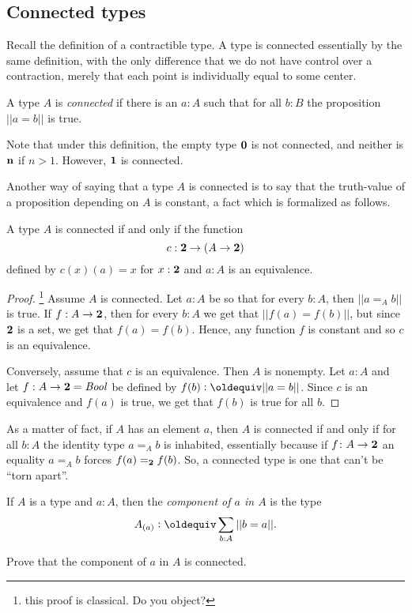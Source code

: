 \begin{definition}
\subsection{Connected types}
\label{sec:connectedtypes}
Recall the definition of a contractible type.  A type is connected essentially by the same definition, with the only difference that we do not have control over a contraction, merely that each point is individually equal to some center.
\begin{definition}\label{def:connected}
A type $A$ is \emph{connected} if there is an $a:A$ such that for all $b:B$ the proposition $||a=b||$ is true.  
\end{definition}
Note that under this definition, the empty type $\mathbf{0} $ is not connected, and neither is $\mathbf{n} $ if $n>1$. However, $\mathbf{1} $ is connected.

Another way of saying that a type $A$ is connected is to say that the truth-value of a proposition depending on $A$ is constant, a fact which is formalized as follows.
\begin{lemma}
  A type $A$ is connected if and only if the function 
$$c:\mathbf{2} \to(A\to\mathbf{2} )$$ defined by $c(x)(a)=x$ for $x:\mathbf{2} $ and $a:A$ 
is an equivalence. 
\end{lemma}
  \begin{proof}\footnote{this proof is classical.  Do you object?}    
    Assume $A$ is connected.  Let $a:A$ be so that for every $b:A$, then $||a=_Ab||$ is true.  If $f:A\to\mathbf{2} $, then for every $b:A$ we get that $||f(a)=f(b)||$, but since $\mathbf{2} $ is a set, we get that $f(a)=f(b)$.  Hence, any function $f$ is constant and so $c$ is an equivalence.

Conversely, assume that $c$ is an equivalence.  Then $A$ is nonempty.  Let $a:A$ and let $f:A\to \mathbf{2} =\mathop{\mathit{Bool}}$ be defined by $f(b)\defequi||a=b||$.  Since $c$ is an equivalence and $f(a)$ is true, we get that $f(b)$ is true for all $b$.   
  \end{proof}

 As a matter of fact, if $A$ has an element $a$, then $A$ is connected if and only if for all $b:A$ the identity type $a=_Ab$ is inhabited, essentially because if $f\colon A\to\mathbf{2} $ an equality $a=_Ab$ forces $f(a)=_{\mathbf{2} }f(b)$.  So, a connected type is one that can't be ``torn apart''.  
\begin{definition}
    If $A$ is a type and $a:A$, then the \emph{component of $a$ in $A$} is the type
$$A_{(a)}\defequi \sum_{b:A}||b=a||.$$
\end{definition}
\begin{xca}
  Prove that the component of $a$ in $A$ is connected.  


\end{xca}
\end{definition}
